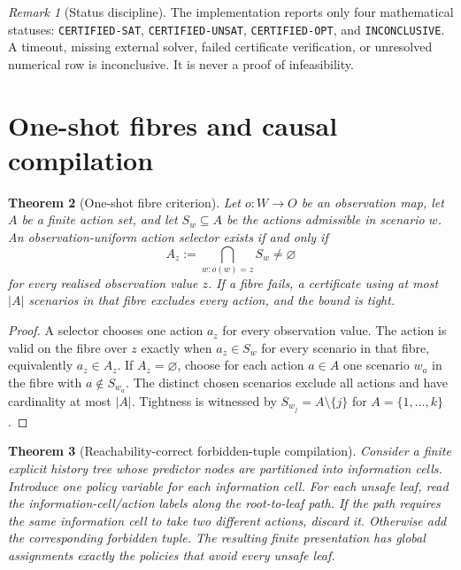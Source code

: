 \documentclass[11pt]{article}
\theoremstyle{plain}
\newtheorem{theorem}{Theorem}[section]
\theoremstyle{definition}
\theoremstyle{remark}
\newtheorem{remark}[theorem]{Remark}
\begin{document}
\begin{remark}[Status discipline]
The implementation reports only four mathematical statuses:
\texttt{CERTIFIED-SAT}, \texttt{CERTIFIED-UNSAT}, \texttt{CERTIFIED-OPT}, and
\texttt{INCONCLUSIVE}.  A timeout, missing external solver, failed certificate
verification, or unresolved numerical row is inconclusive.  It is never a proof
of infeasibility.
\end{remark}

\section{One-shot fibres and causal compilation}
\label{sec:fibres-compilation}

\begin{theorem}[One-shot fibre criterion]
Let \(o:W\to O\) be an observation map, let \(A\) be a finite action set, and
let \(S_w\subseteq A\) be the actions admissible in scenario \(w\).  An
observation-uniform action selector exists if and only if
\[
  A_z:=\bigcap_{w:o(w)=z}S_w\ne\varnothing
\]
for every realised observation value \(z\).  If a fibre fails, a certificate
using at most \(|A|\) scenarios in that fibre excludes every action, and the
bound is tight.
\end{theorem}

\begin{proof}
A selector chooses one action \(a_z\) for every observation value.  The action is
valid on the fibre over \(z\) exactly when \(a_z\in S_w\) for every scenario in
that fibre, equivalently \(a_z\in A_z\).  If \(A_z=\varnothing\), choose for each
action \(a\in A\) one scenario \(w_a\) in the fibre with \(a\notin S_{w_a}\).
The distinct chosen scenarios exclude all actions and have cardinality at most
\(|A|\).  Tightness is witnessed by \(S_{w_j}=A\setminus\{j\}\) for
\(A=\{1,\ldots,k\}\).
\end{proof}

\begin{theorem}[Reachability-correct forbidden-tuple compilation]
Consider a finite explicit history tree whose predictor nodes are partitioned
into information cells.  Introduce one policy variable for each information
cell.  For each unsafe leaf, read the information-cell/action labels along the
root-to-leaf path.  If the path requires the same information cell to take two
different actions, discard it.  Otherwise add the corresponding forbidden tuple.
The resulting finite presentation has global assignments exactly the policies
that avoid every unsafe leaf.
\end{theorem}
\end{document}
